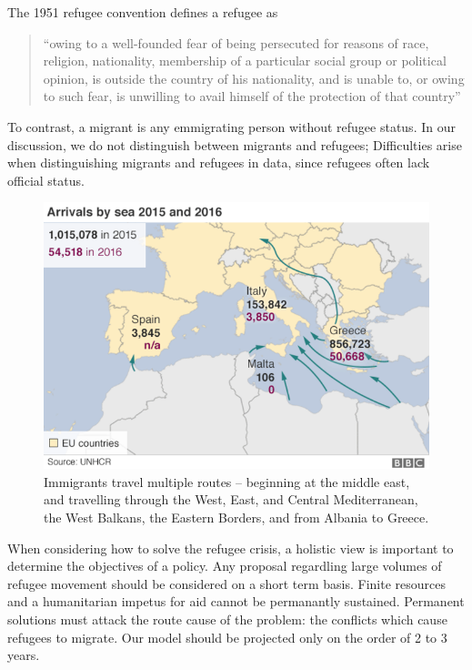 \documentclass{article}
\begin{document}
The 1951 refugee convention defines a refugee as

\begin{quote}
    ``owing to a well-founded fear of being persecuted for reasons of race, religion, nationality, membership of a particular social group or political opinion, is outside the country of his nationality, and is unable to, or owing to such fear, is unwilling to avail himself of the protection of that country'' \cite{1951convention}
\end{quote}
%
To contrast, a migrant is any emmigrating person without refugee status. In our discussion, we do not distinguish between migrants and refugees; Difficulties arise when distinguishing migrants and refugees in data, since refugees often lack official status.

\begin{figure}[h]
\begin{center}
\includegraphics[scale=0.5]{travelmap}
\caption{Immigrants travel multiple routes -- beginning at the middle east, and travelling through the West, East, and Central Mediterranean, the West Balkans, the Eastern Borders, and from Albania to Greece. \cite{BBCgraphics}}
\end{center}
\end{figure}

When considering how to solve the refugee crisis, a holistic view is important to determine the objectives of a policy. Any proposal regardling large volumes of refugee movement should be considered on a short term basis. Finite resources and a humanitarian impetus for aid cannot be permanantly sustained. Permanent solutions must attack the route cause of the problem: the conflicts which cause refugees to migrate. Our model should be projected only on the order of 2 to 3 years.
\end{document}
